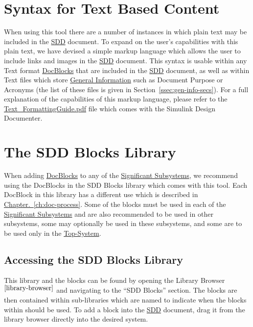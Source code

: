 \documentclass{mcscert}
\newcommand{\sddtool}{Simulink Design Documenter}
\newcommand{\sddblks}{SDD Blocks Library}
\newcommand{\topsystemnolink}{Top-System} %
\newcommand{\topsystem}{\hyperref[def:topsystem]{\topsystemnolink{}}}
\newcommand{\sigsubsnolink}{Significant Subsystems} %
\newcommand{\sigsubs}{\hyperref[def:sigsubs]{\sigsubsnolink{}}}
\newcommand{\geninfonolink}{General Information}
\newcommand{\geninfo}{\hyperref[def:general-info]{\geninfonolink{}}}
\newcommand{\docblockslink}{\hyperref[def:docblock]{\textsf{DocBlocks}}}
\begin{document}
\section{Syntax for Text Based Content}
\label{sec:textsyntax}
When using this tool there are a number of instances in which plain text may be included in the \hyperref[acr:sdd]{SDD} document. 
To expand on the user's capabilities with this plain text, we have devised a simple markup language which allows the user to include links and images in the \hyperref[acr:sdd]{SDD} document. 
This syntax is usable within any Text format \docblockslink{} that are included in the \hyperref[acr:sdd]{SDD} document, as well as within Text files which store \geninfo{} such as Document Purpose or Acronyms (the list of these files is given in Section~\hyperref[ssec:gen-info-secs]{\ref*{ssec:gen-info-secs}}). 
For a full explanation of the capabilities of this markup language, please refer to the \href{run:Text_FormattingGuide.pdf}{Text\_FormattingGuide.pdf} file which comes with the \sddtool{}.

\section{The \sddblks{}}
\label{ssec:SDD-Blocks-Lib}
When adding \docblockslink{} to any of the \sigsubs{}, we recommend using the \textsf{DocBlocks} in the SDD Blocks library which comes with this tool. 
Each \textsf{DocBlock} in this library has a different use which is described in \hyperref[ch:doc-process]{Chapter.~\ref*{ch:doc-process}}. 
Some of the blocks must be used in each of the \sigsubs{} and are also recommended to be used in other subsystems, some may optionally be used in these subsystems, and some are to be used only in the \topsystem{}. 
      
	\subsection{Accessing the \sddblks{}}
	This library and the blocks can be found by opening the \simulink{} Library Browser $^{\ref{library-browser}}$ and navigating to the ``SDD Blocks'' section. 
	The blocks are then contained within sub-libraries which are named to indicate when the blocks within should be used. 
	To add a block into the \hyperref[acr:sdd]{SDD} document, drag it from the library browser directly into the desired system.
      
\end{document}
